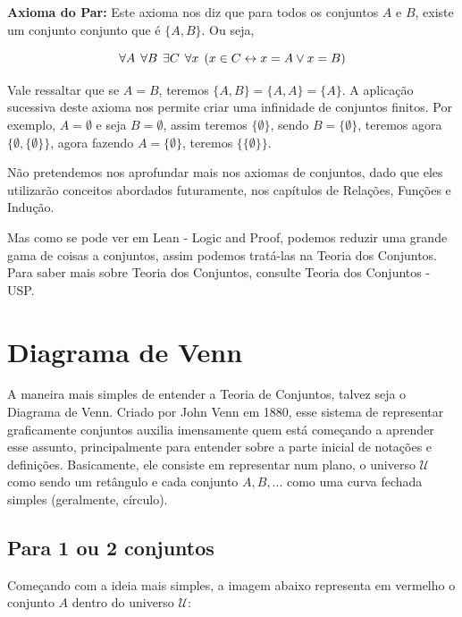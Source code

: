 \textbf{Axioma do Par:} Este axioma nos diz que para todos os conjuntos $A$ e $B$, existe um conjunto conjunto que é $\{A,B\}$. Ou seja,

\[\forall A \hspace{1.5mm} \forall B \hspace{1.5mm} \exists C \hspace{1.5mm} \forall x \hspace{1.5mm} (x \in C \leftrightarrow x = A \vee x = B)\]

Vale ressaltar que se $A=B$, teremos $\{A,B\}=\{A,A\}=\{A\}$. A aplicação sucessiva deste axioma nos permite criar uma infinidade de conjuntos finitos. Por exemplo, $A=\emptyset$ e seja $B=\emptyset$, assim teremos $\{\emptyset\}$, sendo $B=\{\emptyset\}$, teremos agora $\{\emptyset,\{\emptyset\}\}$, agora fazendo $A=\{\emptyset\}$, teremos $\{\{\emptyset\}\}$.

Não pretendemos nos aprofundar mais nos axiomas de conjuntos, dado que eles utilizarão conceitos abordados futuramente, nos capítulos de Relações, Funções e Indução.

Mas como se pode ver em Lean - Logic and Proof, podemos reduzir uma grande gama de coisas a conjuntos, assim podemos tratá-las na Teoria dos Conjuntos. Para saber mais sobre Teoria dos Conjuntos, consulte Teoria dos Conjuntos - USP.

\section{Diagrama de Venn}
A maneira mais simples de entender a Teoria de Conjuntos, talvez seja o Diagrama de Venn. Criado por John Venn em 1880, esse sistema de representar graficamente conjuntos auxilia imensamente quem está começando a aprender esse assunto, principalmente para entender sobre a parte inicial de notações e definições. Basicamente, ele consiste em representar num plano, o universo $\mathcal U$ como sendo um retângulo e cada conjunto $A,B,...$ como uma curva fechada simples (geralmente, círculo).

\subsection{Para 1 ou 2 conjuntos}
Começando com a ideia mais simples, a imagem abaixo representa em vermelho o conjunto $A$ dentro do universo $\mathcal U$:



